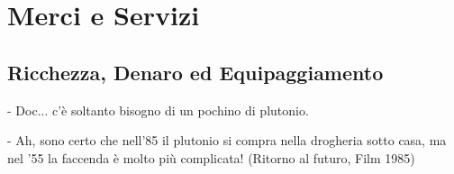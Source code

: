 \section{Merci e Servizi}

\subsection{Ricchezza, Denaro ed Equipaggiamento}

\begin{changemargin}{0.3cm}{0.3cm}\begin{enfasi}{
- Doc... c'è soltanto bisogno di un pochino di plutonio.

\medskip

- Ah, sono certo che nell'85 il plutonio si compra nella drogheria sotto casa, ma nel '55 la faccenda è molto più complicata! (Ritorno al futuro, Film 1985)}
\end{enfasi}\end{changemargin}\medskip

